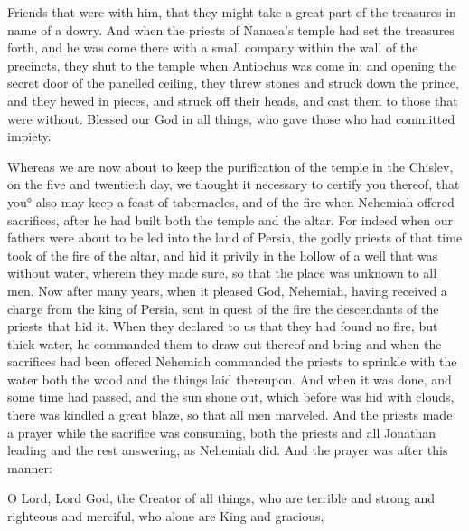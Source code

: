 { Friends that were with him, that they might take a great part of the treasures in name of a dowry.
And when the priests of Nanaea’s temple had set
 the treasures forth, and he was come there with a small company within the wall of the precincts, they shut to the temple when Antiochus was come in:
and opening the secret door of the panelled ceiling, they threw stones and
 struck down the prince, and they hewed
{} in pieces, and struck off their heads, and cast them to those that were without.
Blessed
{} our God in all things, who gave
{} those who had committed impiety.
\par }{\PP {}Whereas we are now about to keep the purification of the temple in the
{} Chislev, on the five and twentieth day, we thought it necessary to certify you thereof, that
 you° also may keep a feast of tabernacles, and
{} of the fire
{} when Nehemiah offered sacrifices, after he had built both the temple and the altar.
For indeed when our fathers were about to be led into the land of Persia, the godly priests of that time took of the fire of the altar, and hid it privily in the hollow of a well that was without water, wherein they made
{} sure, so that the place was unknown to all men.
Now after many years, when it pleased God, Nehemiah, having received a charge from the king of Persia, sent in quest of the fire the descendants of the priests that hid it. When they declared to us that they had found no fire, but thick water,
he commanded them to draw out thereof and bring
{} and when
 the sacrifices had been offered
{} Nehemiah commanded the priests to sprinkle with the water both the wood and the things laid thereupon.
And when it was done, and some time had passed, and the sun shone out, which before was hid with clouds, there was kindled a great blaze, so that all men marveled.
And the priests made a prayer while the sacrifice was consuming, both the priests and all
{} Jonathan leading and the rest answering, as Nehemiah did.
And the prayer was after this manner:
\par }{\PP O Lord, Lord God, the Creator of all things, who are terrible and strong and righteous and merciful, who alone are King and gracious,
}
